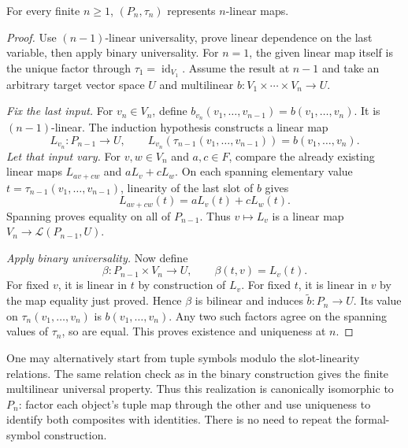 \begin{theorem}\label{thm:finite-tensors}
For every finite $n\geq1$, $(P_n,\tau_n)$ represents $n$-linear maps.
\end{theorem}
\begin{proof}
Use $(n-1)$-linear universality, prove linear dependence
on the last variable, then apply binary universality.
For $n=1$, the given linear map itself is the unique factor through
$\tau_1=\operatorname{id}_{V_1}$. Assume the result at $n-1$ and take
an arbitrary target vector space $U$ and multilinear
$b:V_1\times\cdots\times V_n\to U$.

\emph{Fix the last input.} For $v_n\in V_n$, define
$b_{v_n}(v_1,\ldots,v_{n-1})=b(v_1,\ldots,v_n)$.
It is $(n-1)$-linear. The induction hypothesis constructs a linear map
\[
L_{v_n}:P_{n-1}\longrightarrow U,\qquad
L_{v_n}(\tau_{n-1}(v_1,\ldots,v_{n-1}))=b(v_1,\ldots,v_n).
\]
\emph{Let that input vary.} For $v,w\in V_n$ and $a,c\in F$, compare
the already existing linear maps $L_{av+cw}$ and $aL_v+cL_w$.
On each spanning elementary value $t=\tau_{n-1}(v_1,\ldots,v_{n-1})$,
linearity of the last slot of $b$ gives
\[
L_{av+cw}(t)=aL_v(t)+cL_w(t).
\]
Spanning proves equality on all of $P_{n-1}$. Thus
$v\mapsto L_v$ is a linear map $V_n\to\mathcal L(P_{n-1},U)$.

\emph{Apply binary universality.} Now define
\[
\beta:P_{n-1}\times V_n\longrightarrow U,\qquad \beta(t,v)=L_v(t).
\]
For fixed $v$, it is linear in $t$ by construction of $L_v$. For
fixed $t$, it is linear in $v$ by the map equality just proved.
Hence $\beta$ is bilinear and induces $\widetilde b:P_n\to U$.
Its value on $\tau_n(v_1,\ldots,v_n)$ is $b(v_1,\ldots,v_n)$.
Any two such factors agree on the spanning values of $\tau_n$, so
are equal. This proves existence and uniqueness at $n$.
\end{proof}

\begin{remark}\label{prop:finite-tensor-comparison}
One may alternatively start from tuple symbols modulo the slot-linearity
relations. The same relation check as in the binary construction gives
the finite multilinear universal property. Thus this realization is
canonically isomorphic to $P_n$: factor each object's tuple map through
the other and use uniqueness to identify both composites with identities.
There is no need to repeat the formal-symbol construction.
\end{remark}

